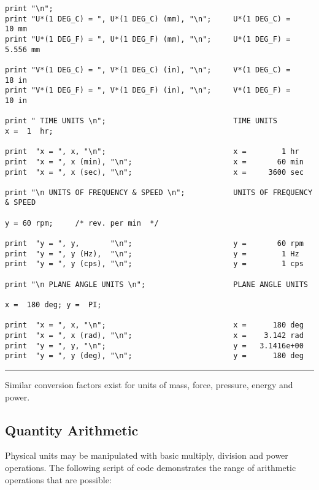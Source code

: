 \begin{footnotesize}
\begin{verbatim}
print "\n";
print "U*(1 DEG_C) = ", U*(1 DEG_C) (mm), "\n";     U*(1 DEG_C) =       10 mm
print "U*(1 DEG_F) = ", U*(1 DEG_F) (mm), "\n";     U*(1 DEG_F) =    5.556 mm

print "V*(1 DEG_C) = ", V*(1 DEG_C) (in), "\n";     V*(1 DEG_C) =       18 in
print "V*(1 DEG_F) = ", V*(1 DEG_F) (in), "\n";     V*(1 DEG_F) =       10 in

print " TIME UNITS \n";                             TIME UNITS 
x =  1  hr;

print  "x = ", x, "\n";                             x =        1 hr
print  "x = ", x (min), "\n";                       x =       60 min
print  "x = ", x (sec), "\n";                       x =     3600 sec

print "\n UNITS OF FREQUENCY & SPEED \n";           UNITS OF FREQUENCY & SPEED

y = 60 rpm;     /* rev. per min  */

print  "y = ", y,       "\n";                       y =       60 rpm
print  "y = ", y (Hz),  "\n";                       y =        1 Hz
print  "y = ", y (cps), "\n";                       y =        1 cps

print "\n PLANE ANGLE UNITS \n";                    PLANE ANGLE UNITS 

x =  180 deg; y =  PI;

print  "x = ", x, "\n";                             x =      180 deg
print  "x = ", x (rad), "\n";                       x =    3.142 rad
print  "y = ", y, "\n";                             y =   3.1416e+00 
print  "y = ", y (deg), "\n";                       y =      180 deg
\end{verbatim}
\rule{6.25 in}{0.035 in}
\end{footnotesize}

\vspace{0.15 in}\noindent
Similar conversion factors exist for units of mass,
force, pressure, energy and power.

\subsection{Quantity Arithmetic}

\vspace{0.15 in}
\noindent\hspace{0.50 in}
Physical units may be manipulated with
basic multiply, division and power operations.
The following script of code demonstrates the
range of arithmetic operations that are possible:

